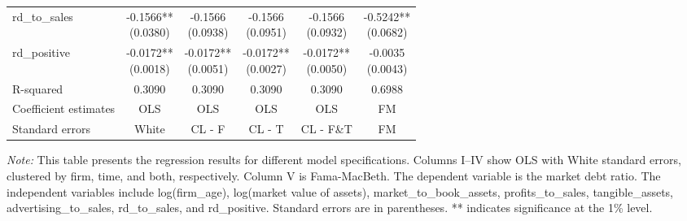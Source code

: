\documentclass{article}
\begin{document}
\begin{longtable}{@{\extracolsep{\fill}}lccccc}
    rd\_to\_sales                 &
    \makecell{-0.1566**                                                           \\(0.0380)} &
    \makecell{-0.1566                                                             \\(0.0938)} &
    \makecell{-0.1566                                                             \\(0.0951)} &
    \makecell{-0.1566                                                             \\(0.0932)} &
    \makecell{-0.5242**                                                           \\(0.0682)} \\
    rd\_positive                  &
    \makecell{-0.0172**                                                           \\(0.0018)} &
    \makecell{-0.0172**                                                           \\(0.0051)} &
    \makecell{-0.0172**                                                           \\(0.0027)} &
    \makecell{-0.0172**                                                           \\(0.0050)} &
    \makecell{-0.0035                                                             \\(0.0043)} \\
    R-squared                     & 0.3090 & 0.3090 & 0.3090 & 0.3090    & 0.6988 \\
    Coefficient estimates         & OLS    & OLS    & OLS    & OLS       & FM     \\
    Standard errors               & White  & CL - F & CL - T & CL - F\&T & FM     \\
\end{longtable}
{\parbox{\textwidth}{
    \footnotesize
    \textit{Note:} This table presents the regression results for different model specifications.
    Columns I--IV show OLS with White standard errors, clustered by firm, time, and both, respectively.
    Column V is Fama-MacBeth.
    The dependent variable is the market debt ratio.
    The independent variables include log(firm\_age), log(market value of assets), market\_to\_book\_assets, profits\_to\_sales, tangible\_assets, advertising\_to\_sales, rd\_to\_sales, and rd\_positive.
    Standard errors are in parentheses.
    ** indicates significance at the 1\% level.
}}
\end{document}
